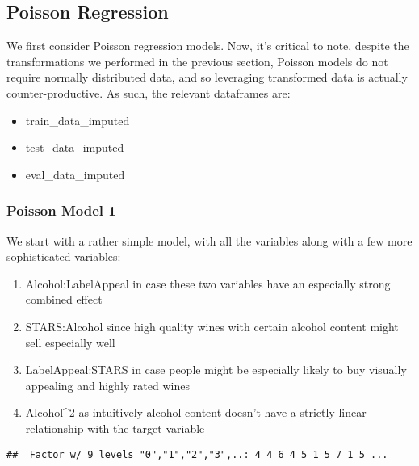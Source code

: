 \documentclass[
]{article}
\providecommand{\tightlist}{%
  \setlength{\itemsep}{0pt}\setlength{\parskip}{0pt}}
\begin{document}
\subsection{Poisson Regression}\label{poisson-regression}

We first consider Poisson regression models. Now, it's critical to note,
despite the transformations we performed in the previous section,
Poisson models do not require normally distributed data, and so
leveraging transformed data is actually counter-productive. As such, the
relevant dataframes are:

\begin{itemize}
\tightlist
\item
  train\_data\_imputed
\item
  test\_data\_imputed
\item
  eval\_data\_imputed
\end{itemize}

\subsubsection{Poisson Model 1}\label{poisson-model-1}

We start with a rather simple model, with all the variables along with a
few more sophisticated variables:

\begin{enumerate}
\def\labelenumi{\arabic{enumi}.}
\tightlist
\item
  Alcohol:LabelAppeal in case these two variables have an especially
  strong combined effect
\item
  STARS:Alcohol since high quality wines with certain alcohol content
  might sell especially well
\item
  LabelAppeal:STARS in case people might be especially likely to buy
  visually appealing and highly rated wines
\item
  Alcohol\^{}2 as intuitively alcohol content doesn't have a strictly
  linear relationship with the target variable
\end{enumerate}

\begin{verbatim}
##  Factor w/ 9 levels "0","1","2","3",..: 4 4 6 4 5 1 5 7 1 5 ...
\end{verbatim}
\end{document}
